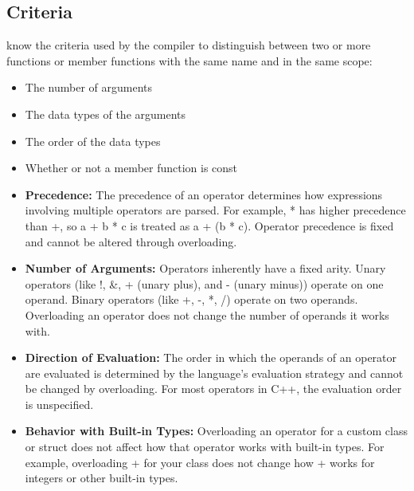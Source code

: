 \documentclass{report}
\begin{document}
    \pagebreak 
    \bigbreak \noindent 
    \subsection{Criteria}
    \bigbreak \noindent 
    know the criteria used by the compiler to distinguish between two or more functions or member functions with the same name and in the same scope:
    \begin{itemize}
        \item The number of arguments
        \item The data types of the arguments
        \item The order of the data types
        \item Whether or not a member function is const
    \end{itemize}
    \bigbreak \noindent 

    \pagebreak 
    \begin{itemize}
        \item \textbf{Precedence:} The precedence of an operator determines how expressions involving multiple operators are parsed. For example, * has higher precedence than +, so a + b * c is treated as a + (b * c). Operator precedence is fixed and cannot be altered through overloading.
        \item \textbf{Number of Arguments:} Operators inherently have a fixed arity. Unary operators (like !, &, + (unary plus), and - (unary minus)) operate on one operand. Binary operators (like +, -, *, /) operate on two operands. Overloading an operator does not change the number of operands it works with.
        \item \textbf{Direction of Evaluation:} The order in which the operands of an operator are evaluated is determined by the language's evaluation strategy and cannot be changed by overloading. For most operators in C++, the evaluation order is unspecified.
        \item \textbf{Behavior with Built-in Types:} Overloading an operator for a custom class or struct does not affect how that operator works with built-in types. For example, overloading + for your class does not change how + works for integers or other built-in types.
    \end{itemize}
\end{document}
